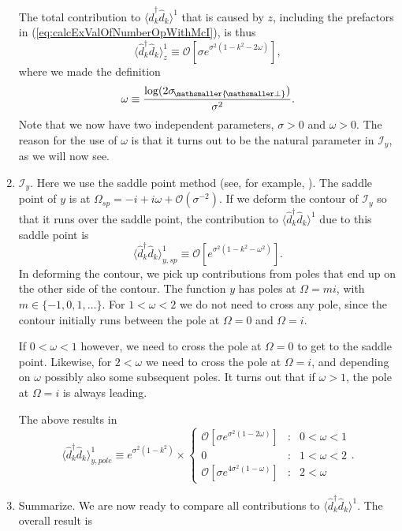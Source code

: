 \documentclass[11pt, a4paper]{article}
\newcommand{\om}{\omega}
\newcommand{\Om}{\Omega}
\newcommand{\si}{{\sigma}}
\newcommand{\mc}[1]{\mathcal{#1}}
\let\perptmp\perp
\renewcommand{\perp}{{\! \mathsmaller{\perptmp}}}
\newcommand{\nodagger}{{\phantom{\dagger}}}
\newcommand{\ddd}{\langle \hat d_k^\dagger \hat d^\nodagger_k \rangle}
\begin{document}
\begin{enumerate}
The total contribution to $\ddd^1$ that is caused by $z$, including the prefactors in (\ref{eq:calcExValOfNumberOpWithMcI}), is thus
\begin{equation*}
\ddd^1_z\equiv\mathcal O \left[\si e^{\si^2(1-k^2-2\omega)}\right],
\end{equation*}
where we made the definition
\begin{equation*}
\om\equiv \frac{\log(2\si_\perp)}{\si^2}.
\end{equation*}
Note that we now have two independent parameters, $\si>0$ and $\om>0$. The reason for the use of $\om$ is that it turns out to be the natural parameter in $\mathcal I_y$, as we will now see. 

\item $\mathcal I_y$. Here we use the saddle point method (see, for example, \cite{Arfken}). 
The saddle point of $y$ is at $\Om_{sp}=-i+ i\om+\mathcal O(\si^{-2})$. If we deform the contour of $\mc I_y$ so that it runs over the saddle point, the contribution to $\ddd^1$ due to this saddle point is
\begin{equation}
\langle \hat d_k^\dagger \hat d_k  \rangle^1_{y,sp}\equiv\mathcal O \left[ e^{\si^2(1-k^2-\om^2)}\right].
\end{equation}
In deforming the contour, we pick up contributions from poles that end up on the other side of the contour. The function $y$ has poles at $\Om=m i$, with $m\in\{-1,0,1,\ldots\}$. For $1<\om<2$ we do not need to cross any pole, since the contour initially runs between the pole at $\Om=0$ and $\Om=i$.


If $0<\om<1$ however, we need to cross the pole at $\Om=0$ to get to the saddle point. Likewise, for $2<\om$ we need to cross the pole at $\Om=i$, and depending on $\om$ possibly also some subsequent poles. It turns out that if $\om>1$, the pole at $\Om=i$ is always leading. 

The above results in
\begin{equation*}
\ddd^1_{y,pole}\equiv
e^{\si^2(1-k^2)}\times
\left\{\begin{array}{lll}
\mathcal O [\si e^{\si^2(1-2\om)}] &:&  0<\om <1\\
0 &:& 1<\om<2\\
\mathcal O [\si e^{4\si^2(1-\om)}] &:&  2<\om
\end{array}\right. .
\end{equation*}

\item Summarize. We are now ready to compare all contributions to $\ddd^1$. The overall result is


\end{enumerate}
\end{document}
